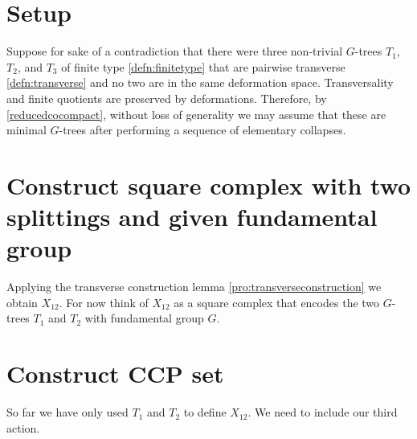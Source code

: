 \documentclass[12pt,parskip=full]{report}
\theoremstyle{plain}
\theoremstyle{definition}
\begin{document}
\section{Setup}

Suppose for sake of a contradiction that there were three non-trivial \(G\)-trees \(T_{1}\), \(T_{2}\), and \(T_{3}\) of finite type \ref{defn:finitetype} that are pairwise transverse \ref{defn:transverse} and no two are in the same deformation space. Transversality and finite quotients are preserved by deformations. Therefore, by \ref{reducedcocompact}, without loss of generality we may assume that these are minimal \(G\)-trees after performing a sequence of elementary collapses. 

\section{Construct square complex with two splittings and given fundamental group}

Applying the transverse construction lemma \ref{pro:transverseconstruction} we obtain \(X_{12}\). For now think of $X_{12}$ as a square complex that encodes the two $G$-trees $T_1$ and $T_2$ with fundamental group $G$.

\section{Construct CCP set}

So far we have only used \(T_1\) and \(T_2\) to define \(X_{12}\). We need to include our third action. 
\end{document}
